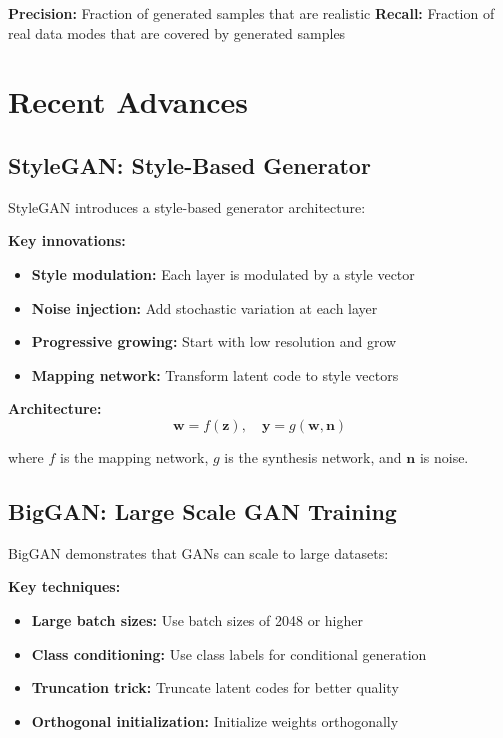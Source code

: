 \textbf{Precision:} Fraction of generated samples that are realistic
\textbf{Recall:} Fraction of real data modes that are covered by generated samples

\section{Recent Advances}

\subsection{StyleGAN: Style-Based Generator}

StyleGAN introduces a style-based generator architecture:

\textbf{Key innovations:}
\begin{itemize}
    \item \textbf{Style modulation:} Each layer is modulated by a style vector
    \item \textbf{Noise injection:} Add stochastic variation at each layer
    \item \textbf{Progressive growing:} Start with low resolution and grow
    \item \textbf{Mapping network:} Transform latent code to style vectors
\end{itemize}

\textbf{Architecture:}
\begin{equation}
    \mathbf{w} = f(\mathbf{z}), \quad \mathbf{y} = g(\mathbf{w}, \mathbf{n})
\end{equation}

where $f$ is the mapping network, $g$ is the synthesis network, and $\mathbf{n}$ is noise.

\subsection{BigGAN: Large Scale GAN Training}

BigGAN demonstrates that GANs can scale to large datasets:

\textbf{Key techniques:}
\begin{itemize}
    \item \textbf{Large batch sizes:} Use batch sizes of 2048 or higher
    \item \textbf{Class conditioning:} Use class labels for conditional generation
    \item \textbf{Truncation trick:} Truncate latent codes for better quality
    \item \textbf{Orthogonal initialization:} Initialize weights orthogonally
\end{itemize}


